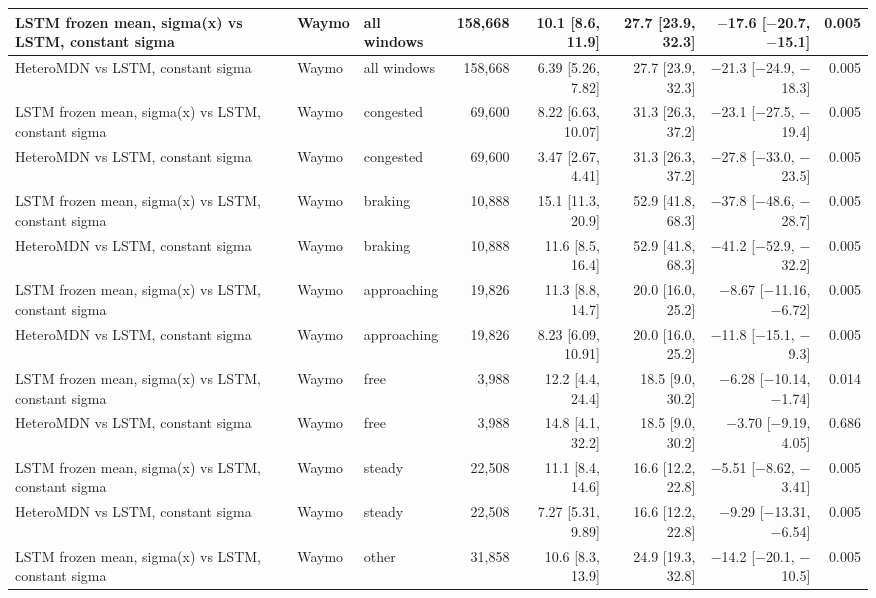 \begin{longtable}{lllrrrrr}
\midrule
LSTM frozen mean, sigma(x) vs LSTM, constant sigma & Waymo & all windows & 158,668 & 10.1 [8.6, 11.9] & 27.7 [23.9, 32.3] & $-$17.6 [$-$20.7, $-$15.1] & 0.005 \\
\midrule
HeteroMDN vs LSTM, constant sigma & Waymo & all windows & 158,668 & 6.39 [5.26, 7.82] & 27.7 [23.9, 32.3] & $-$21.3 [$-$24.9, $-$18.3] & 0.005 \\
\midrule
LSTM frozen mean, sigma(x) vs LSTM, constant sigma & Waymo & congested & 69,600 & 8.22 [6.63, 10.07] & 31.3 [26.3, 37.2] & $-$23.1 [$-$27.5, $-$19.4] & 0.005 \\
\midrule
HeteroMDN vs LSTM, constant sigma & Waymo & congested & 69,600 & 3.47 [2.67, 4.41] & 31.3 [26.3, 37.2] & $-$27.8 [$-$33.0, $-$23.5] & 0.005 \\
\midrule
LSTM frozen mean, sigma(x) vs LSTM, constant sigma & Waymo & braking & 10,888 & 15.1 [11.3, 20.9] & 52.9 [41.8, 68.3] & $-$37.8 [$-$48.6, $-$28.7] & 0.005 \\
\midrule
HeteroMDN vs LSTM, constant sigma & Waymo & braking & 10,888 & 11.6 [8.5, 16.4] & 52.9 [41.8, 68.3] & $-$41.2 [$-$52.9, $-$32.2] & 0.005 \\
\midrule
LSTM frozen mean, sigma(x) vs LSTM, constant sigma & Waymo & approaching & 19,826 & 11.3 [8.8, 14.7] & 20.0 [16.0, 25.2] & $-$8.67 [$-$11.16, $-$6.72] & 0.005 \\
\midrule
HeteroMDN vs LSTM, constant sigma & Waymo & approaching & 19,826 & 8.23 [6.09, 10.91] & 20.0 [16.0, 25.2] & $-$11.8 [$-$15.1, $-$9.3] & 0.005 \\
\midrule
LSTM frozen mean, sigma(x) vs LSTM, constant sigma & Waymo & free & 3,988 & 12.2 [4.4, 24.4] & 18.5 [9.0, 30.2] & $-$6.28 [$-$10.14, $-$1.74] & 0.014 \\
\midrule
HeteroMDN vs LSTM, constant sigma & Waymo & free & 3,988 & 14.8 [4.1, 32.2] & 18.5 [9.0, 30.2] & $-$3.70 [$-$9.19, 4.05] & 0.686 \\
\midrule
LSTM frozen mean, sigma(x) vs LSTM, constant sigma & Waymo & steady & 22,508 & 11.1 [8.4, 14.6] & 16.6 [12.2, 22.8] & $-$5.51 [$-$8.62, $-$3.41] & 0.005 \\
\midrule
HeteroMDN vs LSTM, constant sigma & Waymo & steady & 22,508 & 7.27 [5.31, 9.89] & 16.6 [12.2, 22.8] & $-$9.29 [$-$13.31, $-$6.54] & 0.005 \\
\midrule
LSTM frozen mean, sigma(x) vs LSTM, constant sigma & Waymo & other & 31,858 & 10.6 [8.3, 13.9] & 24.9 [19.3, 32.8] & $-$14.2 [$-$20.1, $-$10.5] & 0.005 \\
\midrule

\end{longtable}
